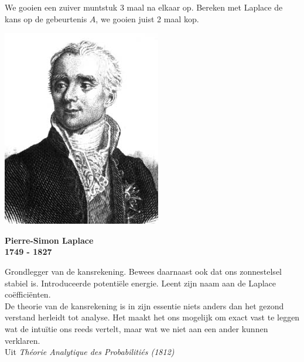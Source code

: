 \documentclass[12pt,twoside]{article}
\begin{document}
\begin{oefening}
We gooien een zuiver muntstuk 3 maal na elkaar op. Bereken met Laplace de kans op de gebeurtenis $A$, we gooien juist 2 maal kop.
\end{oefening}

\vspace*{1cm}
\begin{mdframed}
\begin{minipage}{0.4\textwidth}
  \includegraphics[width=\textwidth]{Laplace}
\end{minipage}
\begin{minipage}{0.6\textwidth}
\begin{center}
  \bf \Large Pierre-Simon Laplace\\
  \normalsize 1749 - 1827
\end{center}
Grondlegger van de kansrekening. Bewees daarnaast ook dat ons zonnestelsel stabiel is. Introduceerde potentiële energie. Leent zijn naam aan de Laplace coëfficiënten.\\

De theorie van de kansrekening is in zijn essentie niets anders dan het gezond verstand herleidt tot analyse. Het maakt het ons mogelijk om exact vast te leggen wat de intuïtie ons reeds vertelt, maar wat we niet aan een ander kunnen verklaren.\\ \hfill{Uit \em Théorie Analytique des Probabilitiés (1812)}
\end{minipage}
\end{mdframed}
\end{document}
